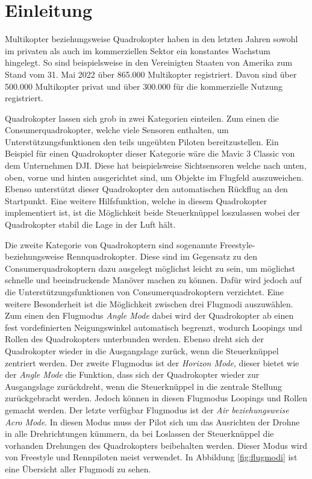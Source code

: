 
\chapter{Einleitung}

Multikopter beziehungsweise Quadrokopter haben in den letzten Jahren sowohl im privaten als auch im kommerziellen Sektor ein konstantes Wachstum hingelegt. So sind beispielsweise in den Vereinigten Staaten von Amerika zum Stand vom 31. Mai 2022 über 865.000 Multikopter registriert. Davon sind über 500.000 Multikopter privat und über 300.000 für die kommerzielle Nutzung registriert. \cites{droneregistrationFAA}{dronestat1}{dronestat2}{dronestat3}

Quadrokopter lassen sich grob in zwei Kategorien einteilen. Zum einen die Consumerquadrokopter, welche viele  Sensoren enthalten, um Unterstützungsfunktionen den teils ungeübten Piloten bereitzustellen. Ein Beispiel für einen Quadrokopter dieser Kategorie wäre die Mavic 3 Classic von dem Unternehmen DJI. Diese hat beispielsweise Sichtsensoren welche nach unten, oben, vorne und hinten ausgerichtet sind, um Objekte im Flugfeld auszuweichen. Ebenso unterstützt dieser Quadrokopter den automatischen Rückflug an den Startpunkt. Eine weitere Hilfsfunktion, welche in diesem Quadrokopter implementiert ist, ist die Möglichkeit beide Steuerknüppel loszulassen wobei der Quadrokopter stabil die Lage in der Luft hält. \cite{djiMavicClassic}

Die zweite Kategorie von Quadrokoptern sind sogenannte Freestyle- beziehungsweise Rennquadrokopter. Diese sind im Gegensatz zu den Consumerquadrokoptern dazu ausgelegt möglichst leicht zu sein, um möglichst schnelle und beeindruckende Manöver machen zu können. Dafür wird jedoch auf die Unterstützungsfunktionen von Consumerquadrokoptern verzichtet. Eine weitere Besonderheit ist die Möglichkeit zwischen drei Flugmodi auszuwählen. Zum einen den Flugmodus \textit{Angle Mode} dabei wird der Quadrokopter ab einen fest vordefinierten Neigungswinkel automatisch begrenzt, wodurch Loopings und Rollen des Quadrokopters unterbunden werden. Ebenso dreht sich der Quadrokopter wieder in die Ausgangslage zurück, wenn die Steuerknüppel zentriert werden. Der zweite Flugmodus ist der \textit{Horizon Mode}, dieser bietet wie der \textit{Angle Mode} die Funktion, dass sich der Quadrokopter wieder zur Ausgangslage zurückdreht, wenn die Steuerknüppel in die zentrale Stellung zurückgebracht werden. Jedoch können in diesen Flugmodus Loopings und Rollen gemacht werden. Der letzte verfügbar Flugmodus ist der \textit{Air beziehungsweise Acro Mode}. In diesen Modus muss der Pilot sich um das Ausrichten der Drohne in alle Drehrichtungen kümmern, da bei Loslassen der Steuerknüppel die vorhanden Drehungen des Quadrokopters beibehalten werden. Dieser Modus wird von Freestyle und Rennpiloten meist verwendet. In Abbildung \ref{fig:flugmodi} ist eine Übersicht aller Flugmodi zu sehen. \cite{wedioFlugmodi}

